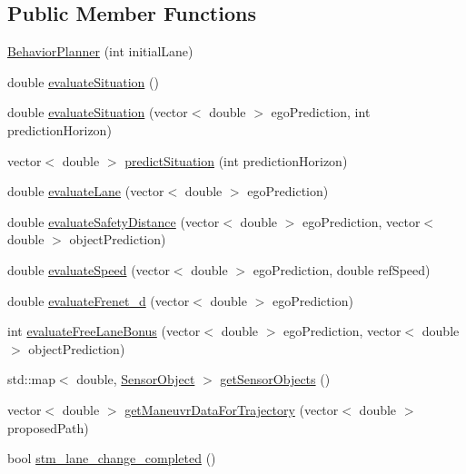 \subsection*{Public Member Functions}
\begin{DoxyCompactItemize}
\item 
\hyperlink{classBehaviorPlanner_aef7c36cbc0cb70964a4e354037ed27a1}{Behavior\+Planner} (int initial\+Lane)
\item 
double \hyperlink{classBehaviorPlanner_aec0fc286b925dcc751af3c6caf3fdef9}{evaluate\+Situation} ()
\item 
double \hyperlink{classBehaviorPlanner_af0d483ed1b5e466fea8e94e3cfe62785}{evaluate\+Situation} (vector$<$ double $>$ ego\+Prediction, int prediction\+Horizon)
\item 
vector$<$ double $>$ \hyperlink{classBehaviorPlanner_a3a4c41036d3094e28f6b8f63b919e985}{predict\+Situation} (int prediction\+Horizon)
\item 
double \hyperlink{classBehaviorPlanner_ac786fd6c315da122b9269e2ef49b988d}{evaluate\+Lane} (vector$<$ double $>$ ego\+Prediction)
\item 
double \hyperlink{classBehaviorPlanner_aee55c3bbfbec8ab034069f15acfb40a6}{evaluate\+Safety\+Distance} (vector$<$ double $>$ ego\+Prediction, vector$<$ double $>$ object\+Prediction)
\item 
double \hyperlink{classBehaviorPlanner_acc2e5ddab8cd80c4fd789b08fcf60f5e}{evaluate\+Speed} (vector$<$ double $>$ ego\+Prediction, double ref\+Speed)
\item 
double \hyperlink{classBehaviorPlanner_aff22cd158b0d8a748e16eb4b9720d7a9}{evaluate\+Frenet\+\_\+d} (vector$<$ double $>$ ego\+Prediction)
\item 
int \hyperlink{classBehaviorPlanner_a833375362e34ebaeaff47005cd0bed6d}{evaluate\+Free\+Lane\+Bonus} (vector$<$ double $>$ ego\+Prediction, vector$<$ double $>$ object\+Prediction)
\item 
std\+::map$<$ double, \hyperlink{classSensorObject}{Sensor\+Object} $>$ \hyperlink{classBehaviorPlanner_ad45a4d61f54fde513d189734ff5b5899}{get\+Sensor\+Objects} ()
\item 
vector$<$ double $>$ \hyperlink{classBehaviorPlanner_a1e4a2c4125916f7533295982350da1d3}{get\+Maneuvr\+Data\+For\+Trajectory} (vector$<$ double $>$ proposed\+Path)
\item 
bool \hyperlink{classBehaviorPlanner_ace8509db32f1ee3ee4a178759b3fb32c}{stm\+\_\+lane\+\_\+change\+\_\+completed} ()
\end{DoxyCompactItemize}
